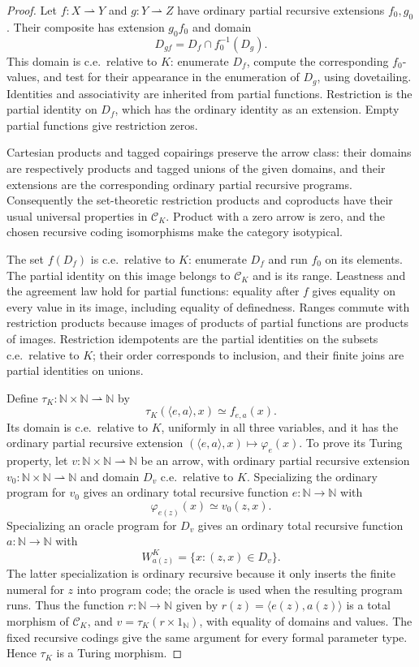 \documentclass[11pt]{article}
\newcommand{\N}{\mathbb N}
\begin{document}
\begin{proof}
Let $f:X\rightharpoonup Y$ and $g:Y\rightharpoonup Z$ have
ordinary partial recursive extensions $f_0,g_0$. Their composite has
extension $g_0f_0$ and domain
\[
 D_{gf}=D_f\cap f_0^{-1}(D_g).
\]
This domain is c.e.\ relative to $K$: enumerate $D_f$, compute the
corresponding $f_0$-values, and test for their appearance in the
enumeration of $D_g$, using dovetailing. Identities and associativity
are inherited from partial functions. Restriction is the partial
identity on $D_f$, which has the ordinary identity as an extension.
Empty partial functions give restriction zeros.

Cartesian products and tagged copairings preserve the arrow class:
their domains are respectively products and tagged unions of the given
domains, and their extensions are the corresponding ordinary partial
recursive programs. Consequently the set-theoretic restriction
products and coproducts have their usual universal properties in
$\mathcal C_K$. Product with a zero arrow is zero, and the chosen
recursive coding isomorphisms make the category isotypical.

The set $f(D_f)$ is c.e.\ relative to $K$: enumerate $D_f$ and run
$f_0$ on its elements. The partial identity on this image belongs to
$\mathcal C_K$ and is its range. Leastness and the agreement law
hold for partial functions: equality after $f$ gives equality on
every value in its image, including equality of definedness.
Ranges commute with restriction products because images of products
of partial functions are products of images. Restriction idempotents
are the partial identities on the subsets c.e.\ relative to $K$;
their order corresponds to inclusion, and their finite joins are
partial identities on unions.

Define $\tau_K:\N\times\N\rightharpoonup\N$ by
\[
 \tau_K(\langle e,a\rangle,x)\simeq f_{e,a}(x).
\]
Its domain is c.e.\ relative to $K$, uniformly in all three
variables, and it has the ordinary partial recursive extension
$(\langle e,a\rangle,x)\mapsto\varphi_e(x)$.
To prove its Turing property, let
$v:\N\times\N\rightharpoonup\N$ be an arrow, with ordinary
partial recursive extension $v_0:\N\times\N\rightharpoonup\N$ and
domain $D_v$ c.e.\ relative to $K$. Specializing the ordinary program
for $v_0$ gives an ordinary total recursive function $e:\N\to\N$ with
\[
 \varphi_{e(z)}(x)\simeq v_0(z,x).
\]
Specializing an oracle program for $D_v$ gives an ordinary total
recursive function $a:\N\to\N$ with
\[
 W_{a(z)}^K=\{x:(z,x)\in D_v\}.
\]
The latter specialization is ordinary recursive because it only
inserts the finite numeral for $z$ into program code; the oracle is
used when the resulting program runs. Thus the function
$r:\N\to\N$ given by $r(z)=\langle e(z),a(z)\rangle$ is a total
morphism of $\mathcal C_K$, and
$v=\tau_K(r\times1_{\N})$, with equality of domains and values.
The fixed recursive codings give the same argument for every formal
parameter type. Hence $\tau_K$ is a Turing morphism.


\end{proof}
\end{document}
